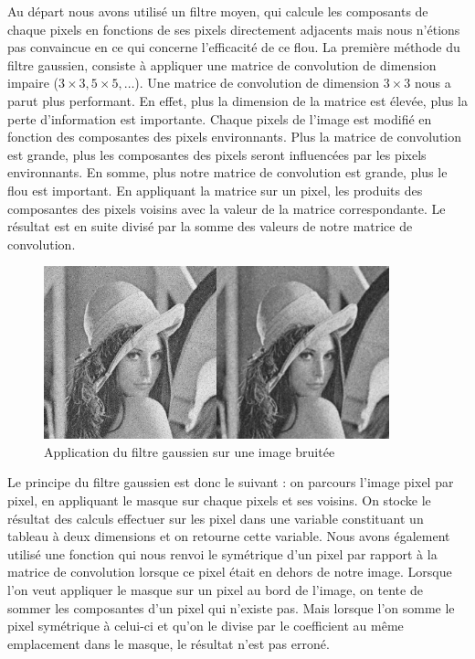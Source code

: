 \documentclass[11pt]{report}
\begin{document}
Au départ nous avons utilisé un filtre moyen, qui calcule les composants de chaque pixels en fonctions de ses pixels directement adjacents mais nous n'étions pas convaincue en ce qui concerne  l'efficacité de ce flou. La première méthode du filtre gaussien, consiste à appliquer une matrice de convolution de dimension impaire ($3 \times 3, 5 \times 5, …$). Une matrice de convolution de dimension $3 \times 3$ nous a parut plus performant. En effet, plus la dimension de la matrice est élevée, plus la perte d'information est importante. Chaque pixels de l'image est modifié en fonction des composantes des pixels environnants. Plus la matrice de convolution est grande, plus les composantes des  pixels seront influencées par les pixels environnants. En somme, plus notre matrice de convolution est grande, plus le flou est important. En appliquant la matrice sur un pixel, les produits des composantes des pixels voisins avec la valeur de la matrice correspondante. Le résultat est en suite divisé par la somme des valeurs de notre matrice de convolution. 

\begin{figure}[htbp]
\centering
\includegraphics[width=10cm]{filtre_gaussien.png}
\caption{Application du filtre gaussien sur une image bruitée}
\end{figure}

Le principe du filtre gaussien est donc le suivant : on parcours l'image pixel par pixel, en appliquant le masque sur chaque pixels et ses voisins. On stocke le résultat des calculs effectuer sur les pixel dans une variable constituant un tableau à deux dimensions et on retourne cette variable. Nous avons également utilisé une fonction qui nous renvoi le symétrique d'un pixel par rapport à la matrice de convolution lorsque ce pixel était en dehors de notre image. Lorsque l'on veut appliquer le masque sur un pixel au bord de l'image, on tente de sommer les composantes d'un pixel qui n'existe pas. Mais lorsque l'on somme le pixel symétrique à celui-ci et qu'on le divise par le coefficient au même emplacement dans le masque, le résultat n'est pas erroné.
\end{document}
